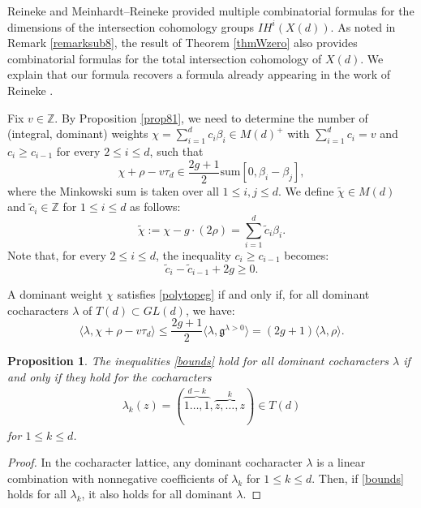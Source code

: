 \documentclass [11pt,oneside,a4paper,mathscr]{amsart}
\newtheorem{prop}[thm]{Proposition}
\theoremstyle{definition}
\renewcommand{\leq}{\leqslant}
\renewcommand{\geq}{\geqslant}
\begin{document}
Reineke \cite{MR2889742} and Meinhardt--Reineke \cite{MeRe} provided multiple combinatorial formulas for the dimensions of the intersection cohomology groups $I\!H^i(X(d))$. 
As noted in Remark \ref{remarksub8}, 
the result of Theorem \ref{thmWzero} also provides combinatorial formulas for the total intersection cohomology of $X(d)$. We explain that our formula recovers a formula already appearing in the work of Reineke \cite[Theorem 7.1]{MR2889742}. 

Fix $v\in \mathbb{Z}$.
By Proposition \ref{prop81}, we need to determine the number of (integral, dominant) weights $\chi=\sum_{i=1}^d c_i\beta_i\in M(d)^+$ with $\sum_{i=1}^d c_i=v$ and $c_i\geq c_{i-1}$ for every $2\leq i\leq d$, such that
\begin{equation}\label{polytopeg}
\chi+\rho-v\tau_d\in \frac{2g+1}{2}\mathrm{sum}[0, \beta_i-\beta_j],
\end{equation}
where the Minkowski sum is taken over all $1\leq i,j\leq d$. 
We define $\widetilde{\chi}\in M(d)$ and $\widetilde{c}_i\in \mathbb{Z}$ for $1\leq i\leq d$ as follows:
\[\widetilde{\chi}:=\chi-g\cdot(2\rho)=\sum_{i=1}^d \widetilde{c}_i\beta_i.\]
Note that, for every $2\leq i\leq d$, the inequality $c_i\geq c_{i-1}$ becomes:
\begin{equation}\label{dominanttilde}
    \widetilde{c}_i-\widetilde{c}_{i-1}+2g\geq 0.
\end{equation}


A dominant weight $\chi$ satisfies \eqref{polytopeg} if and only if, for all dominant cocharacters $\lambda$ of $T(d)\subset GL(d)$, we have:
\begin{equation}\label{bounds}
\langle \lambda, \chi+\rho-v\tau_d\rangle\leq \frac{2g+1}{2}\langle \lambda, \mathfrak{g}^{\lambda>0}\rangle=(2g+1)\langle \lambda, \rho\rangle.
\end{equation}

\begin{prop}\label{propboundslambdal}
    The inequalities \eqref{bounds} hold for all dominant cocharacters $\lambda$ if and only if they hold for the cocharacters \begin{align*}\lambda_k(z)=(\overbrace{1\ldots, 1}^{d-k},\overbrace{z,\ldots, z}^k)\in T(d)
    \end{align*}
    for $1\leq k\leq d$.
\end{prop}

\begin{proof}
    In the cocharacter lattice, any dominant cocharacter $\lambda$ is a linear combination with nonnegative coefficients of $\lambda_k$ for $1\leq k\leq d$. Then, if \eqref{bounds} holds for all $\lambda_k$, it also holds for all dominant $\lambda$.
\end{proof}
\end{document}
